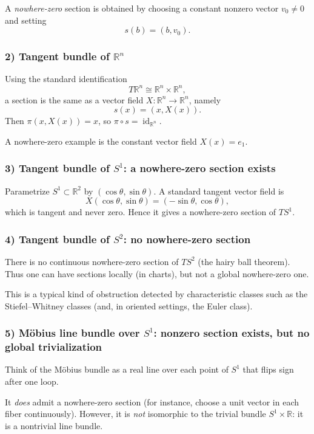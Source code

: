 \documentclass[12pt,a4paper]{article}
\DeclareMathOperator{\id}{id}
\theoremstyle{notespace}
\begin{document}
A \emph{nowhere-zero} section is obtained by choosing a constant nonzero vector $v_0\neq 0$ and setting
\[
s(b)=(b,v_0).
\]

\subsubsection*{2) Tangent bundle of $\mathbb{R}^n$}

Using the standard identification
\[
T\mathbb{R}^n \cong \mathbb{R}^n\times \mathbb{R}^n,
\]
a section is the same as a vector field $X:\mathbb{R}^n\to \mathbb{R}^n$, namely
\[
s(x)=(x,X(x)).
\]
Then $\pi(x,X(x))=x$, so $\pi\circ s=\id_{\mathbb{R}^n}$.

A nowhere-zero example is the constant vector field $X(x)=e_1$.

\subsubsection*{3) Tangent bundle of $S^1$: a nowhere-zero section exists}

Parametrize $S^1\subset \mathbb{R}^2$ by $(\cos\theta,\sin\theta)$. A standard tangent vector field is
\[
X(\cos\theta,\sin\theta)=(-\sin\theta,\cos\theta),
\]
which is tangent and never zero. Hence it gives a nowhere-zero section of $TS^1$.

\subsubsection*{4) Tangent bundle of $S^2$: no nowhere-zero section}

There is no continuous nowhere-zero section of $TS^2$ (the hairy ball theorem). Thus one can have sections locally (in charts), but not a global nowhere-zero one.

This is a typical kind of obstruction detected by characteristic classes such as the Stiefel--Whitney classes (and, in oriented settings, the Euler class).

\subsubsection*{5) M\"obius line bundle over $S^1$: nonzero section exists, but no global trivialization}

Think of the M\"obius bundle as a real line over each point of $S^1$ that flips sign after one loop.

It \emph{does} admit a nowhere-zero section (for instance, choose a unit vector in each fiber continuously). However, it is \emph{not} isomorphic to the trivial bundle $S^1\times \mathbb{R}$: it is a nontrivial line bundle.
\end{document}
